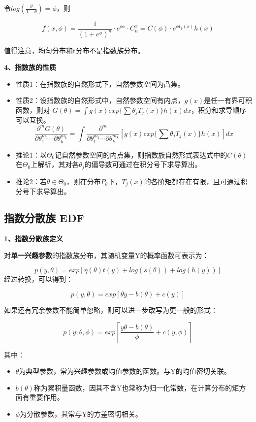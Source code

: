 \documentclass[
]{book}
\begin{document}
令\(log(\frac{\theta}{1-\theta}) = \phi\)，则

\[
f(x,\phi) = \frac{1}{(1+e^\phi)^n}\cdot e^{\phi x}\cdot C_n^x = C(\phi)\cdot e^{\phi t_1(x)}h(x)
\]

值得注意，均匀分布和t分布不是指数族分布。

\textbf{4、指数族的性质}

\begin{itemize}
\item
  性质1：在指数族的自然形式下，自然参数空间为凸集。
\item
  性质2：设指数族的自然形式中，自然参数空间有内点，\(g(x)\)是任一有界可积函数，则对 \(G(\theta) = \int g(x)exp\{\sum\theta_jT_j(x) \}h(x)dx\)，积分和求导顺序可以互换。 \[
    \frac{\partial^mG(\theta)}{\partial\theta_1^{m_1}\cdots \partial\theta_k^{m_k}} = \int\frac{\partial^m}{\partial\theta_1^{m_1}\cdots \partial\theta_k^{m_k}}[g(x)exp\{\sum\theta_jT_j(x) \}h(x)]dx
  \]
\item
  推论1：以\(\Theta_0\)记自然参数空间的内点集，则指数族自然形式表达式中的\(C(\theta)\)在\(\Theta_0\)上解析，其对各\(\theta_j\)的偏导数可通过在积分号下求导算出。
\item
  推论2：若\(\theta\in\Theta_0\)，则在分布\(P_{\theta}\)下，\(T_j(x)\)的各阶矩都存在有限，且可通过积分号下求导算出。
\end{itemize}

\subsection{指数分散族 EDF}\label{ux6307ux6570ux5206ux6563ux65cf-edf}

\textbf{1、指数分散族定义}

对\textbf{单一兴趣参数}的指数族分布，其随机变量Y的概率函数可表示为：

\[
p(y,\theta)=exp[\eta(\theta)t(y)+log(s(\theta))+log(h(y))]
\] 经过转换，可以得到：

\[
p(y,\theta) = exp[\theta y-b(\theta)+c(y)]
\]

如果还有冗余参数不能简单忽略，则可以进一步改写为更一般的形式：

\[
p(y;\theta,\phi)=exp[\frac{y\theta-b(\theta)}{\phi}+c(y,\phi)]
\]

其中：

\begin{itemize}
\item
  \(\theta\)为典型参数，常为兴趣参数或均值参数的函数。与Y的均值密切关联。
\item
  \(b(\theta)\)称为累积量函数，因其不含Y也常称为归一化常数，在计算分布的矩方面有重要作用。
\item
  \(\phi\)为分散参数，其常与Y的方差密切相关。
\end{itemize}
\end{document}

